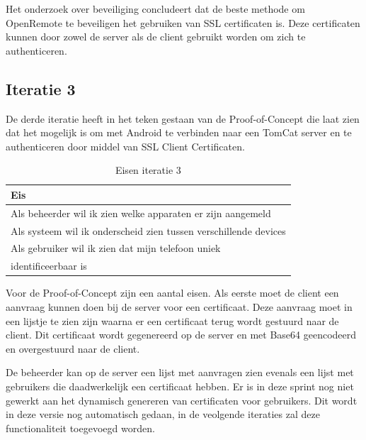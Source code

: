 \documentclass[]{article}
\begin{document}
Het onderzoek over beveiliging concludeert dat de beste methode om
OpenRemote te beveiligen het gebruiken van SSL certificaten is. Deze
certificaten kunnen door zowel de server als de client gebruikt worden om
zich te authenticeren.

\subsection{Iteratie 3}
De derde iteratie heeft in het teken gestaan van de Proof-of-Concept die laat zien
dat het mogelijk is om met Android te verbinden naar een TomCat server en
te authenticeren door middel van SSL Client Certificaten.

\begin{table}[htpb]
  \caption{Eisen iteratie 3}
  \begin{center}
    \begin{tabular}{|| l ||}\hline
        Eis                                                              \\\hline\hline
        Als beheerder wil ik zien welke apparaten er zijn aangemeld      \\\hline
        Als systeem wil ik onderscheid zien tussen verschillende devices \\\hline
        Als gebruiker wil ik zien dat mijn telefoon uniek                \\ 
        identificeerbaar is                                              \\\hline
    \end{tabular}                                                         
  \end{center}                                                            
\end{table}                                                               

Voor de Proof-of-Concept zijn een aantal eisen. Als eerste moet de client
een aanvraag kunnen doen bij de server voor een certificaat. Deze aanvraag
moet in een lijstje te zien zijn waarna er een certificaat terug wordt
gestuurd naar de client. Dit certificaat wordt gegenereerd op de server en
met Base64 geencodeerd en overgestuurd naar de client.

De beheerder kan op de server een lijst met aanvragen zien evenals een
lijst met gebruikers die daadwerkelijk een certificaat hebben. Er is in deze
sprint nog niet gewerkt aan het dynamisch genereren van certificaten voor
gebruikers. Dit wordt in deze versie nog automatisch gedaan, in de veolgende
iteraties zal deze functionaliteit toegevoegd worden.
\end{document}
